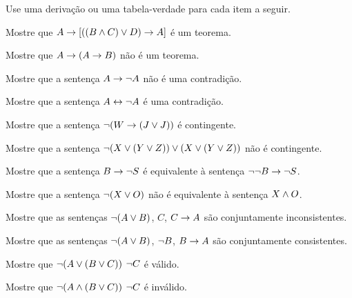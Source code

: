 \practiceproblems
\noindent\problempart Use uma derivação ou uma tabela-verdade para cada item a seguir.
\begin{compactlist}%
\item Mostre que $A \rightarrow [((B \wedge C) \vee D) \rightarrow A]$ é um teorema.
\item Mostre que $A \rightarrow (A \rightarrow B)$ não é um teorema.
\item Mostre que a sentença $A \rightarrow \neg{A}$ não é uma contradição.
\item Mostre que a sentença $A \leftrightarrow \neg A$ é uma contradição.
\item Mostre que a sentença $ \neg (W \rightarrow (J \vee J)) $ é contingente.
\item Mostre que a sentença $ \neg(X \vee (Y \vee Z)) \vee (X \vee (Y \vee Z))$ não é contingente.
 \item Mostre que a sentença $B \rightarrow \neg S$ é equivalente à sentença $\neg \neg B \rightarrow \neg S$.
\item Mostre que a sentença $ \neg (X \vee O) $ não é equivalente à sentença $X \wedge O$.
\item Mostre que as sentenças $\neg(A \vee B)$, $C$, $C \rightarrow A$ são conjuntamente inconsistentes.
\item Mostre que as sentenças $\neg(A \vee B)$, $\neg{B}$, $B \rightarrow A$ são conjuntamente consistentes.
\item Mostre que $\neg(A \vee (B \vee C)) $ \therefore $ \neg{C}$ é válido.
\item Mostre que $\neg(A \wedge (B \vee C))$ \therefore $ \neg{C}$ é inválido.
\end{compactlist}


